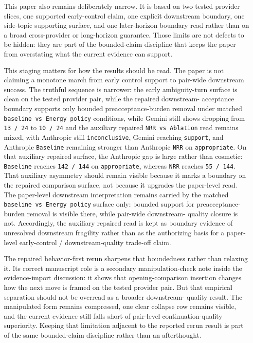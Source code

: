 \documentclass[11pt]{article}
\renewcommand{\_}{\textunderscore\hspace{0pt}}
\newcommand{\code}[1]{\path{#1}}
\begin{document}
This paper also remains deliberately narrow. It is based on
two tested provider slices, one supported early-control claim, one explicit
downstream boundary, one side-topic supporting surface, and one later-horizon
boundary read rather than on a broad cross-provider or long-horizon guarantee.
Those limits are not defects to be hidden: they are part of the bounded-claim
discipline that keeps the paper from overstating what the current evidence can
support.

This staging matters for how the results should be read. The paper is
not claiming a monotone march from early control support to pair-wide
downstream success. The truthful sequence is narrower: the early ambiguity-turn
surface is clean on the tested provider pair, while the repaired downstream-
acceptance boundary supports only bounded preacceptance-burden removal under
matched \texttt{baseline vs Energy policy} conditions, while Gemini still
shows \code{accepted_direction_followthrough_present} dropping from
\texttt{13 / 24} to \texttt{10 / 24} and the auxiliary repaired
\texttt{NRR vs Ablation} read remains mixed, with Anthropic still
\texttt{inconclusive}, Gemini reaching \texttt{support}, and Anthropic
\texttt{Baseline} remaining stronger than Anthropic \texttt{NRR} on
\texttt{appropriate}. On that auxiliary repaired surface, the Anthropic gap is
large rather than cosmetic: \texttt{Baseline} reaches \texttt{142 / 144} on
\texttt{appropriate}, whereas \texttt{NRR} reaches \texttt{55 / 144}. That
auxiliary asymmetry should remain visible because it marks a boundary on the
repaired comparison surface, not because it upgrades the paper-level read. The
paper-level downstream interpretation remains carried by the matched
\texttt{baseline vs Energy policy} surface only: bounded support for
preacceptance-burden removal is visible there, while pair-wide downstream-
quality closure is not. Accordingly, the auxiliary repaired read is kept as
boundary evidence of unresolved downstream fragility rather than as the
authorizing basis for a paper-level early-control / downstream-quality trade-off
claim.

The repaired behavior-first rerun sharpens that boundedness rather than
relaxing it. Its correct manuscript role is a secondary manipulation-check note
inside the evidence-import discussion: it shows that opening-comparison
insertion changes how the next move is framed on the tested provider pair. But
that empirical separation should not be overread as a broader downstream-
quality result. The manipulated form remains compressed, one clear collapse row
remains visible, and the current evidence still falls short of pair-level
continuation-quality superiority. Keeping that limitation adjacent to the
reported rerun result is part of the same bounded-claim discipline rather than
an afterthought.
\end{document}
